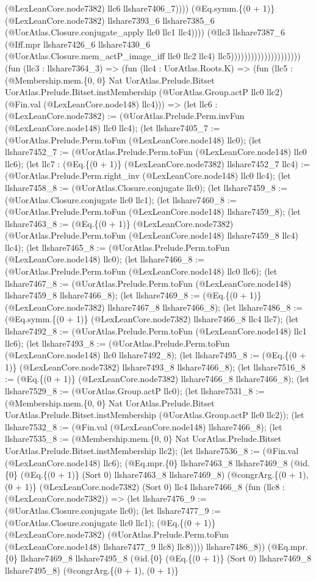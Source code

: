 \documentclass[11pt]{article}
\begin{document}
(@LexLeanCore.node7382) llc6 llshare7406\_7)))) (@Eq.symm.\{(0 + 1)\} (@LexLeanCore.node7382) llshare7393\_6 llshare7385\_6 (@UorAtlas.Closure.conjugate\_apply llc0 llc1 llc4)))) (@llc3 llshare7387\_6 (@Iff.mpr llshare7426\_6 llshare7430\_6 (@UorAtlas.Closure.mem\_actP\_image\_iff llc0 llc2 llc4) llc5))))))))))))))))))))) (fun (llc3 : llshare7364\_3) => (fun (llc4 : UorAtlas.Roots.K) => (fun (llc5 : (@Membership.mem.\{0, 0\} Nat UorAtlas.Prelude.Bitset UorAtlas.Prelude.Bitset.instMembership (@UorAtlas.Group.actP llc0 llc2) (@Fin.val (@LexLeanCore.node148) llc4))) => (let llc6 : (@LexLeanCore.node7382) := (@UorAtlas.Prelude.Perm.invFun (@LexLeanCore.node148) llc0 llc4); (let llshare7405\_7 := (@UorAtlas.Prelude.Perm.toFun (@LexLeanCore.node148) llc0); (let llshare7452\_7 := (@UorAtlas.Prelude.Perm.toFun (@LexLeanCore.node148) llc0 llc6); (let llc7 : (@Eq.\{(0 + 1)\} (@LexLeanCore.node7382) llshare7452\_7 llc4) := (@UorAtlas.Prelude.Perm.right\_inv (@LexLeanCore.node148) llc0 llc4); (let llshare7458\_8 := (@UorAtlas.Closure.conjugate llc0); (let llshare7459\_8 := (@UorAtlas.Closure.conjugate llc0 llc1); (let llshare7460\_8 := (@UorAtlas.Prelude.Perm.toFun (@LexLeanCore.node148) llshare7459\_8); (let llshare7463\_8 := (@Eq.\{(0 + 1)\} (@LexLeanCore.node7382) (@UorAtlas.Prelude.Perm.toFun (@LexLeanCore.node148) llshare7459\_8 llc4) llc4); (let llshare7465\_8 := (@UorAtlas.Prelude.Perm.toFun (@LexLeanCore.node148) llc0); (let llshare7466\_8 := (@UorAtlas.Prelude.Perm.toFun (@LexLeanCore.node148) llc0 llc6); (let llshare7467\_8 := (@UorAtlas.Prelude.Perm.toFun (@LexLeanCore.node148) llshare7459\_8 llshare7466\_8); (let llshare7469\_8 := (@Eq.\{(0 + 1)\} (@LexLeanCore.node7382) llshare7467\_8 llshare7466\_8); (let llshare7486\_8 := (@Eq.symm.\{(0 + 1)\} (@LexLeanCore.node7382) llshare7466\_8 llc4 llc7); (let llshare7492\_8 := (@UorAtlas.Prelude.Perm.toFun (@LexLeanCore.node148) llc1 llc6); (let llshare7493\_8 := (@UorAtlas.Prelude.Perm.toFun (@LexLeanCore.node148) llc0 llshare7492\_8); (let llshare7495\_8 := (@Eq.\{(0 + 1)\} (@LexLeanCore.node7382) llshare7493\_8 llshare7466\_8); (let llshare7516\_8 := (@Eq.\{(0 + 1)\} (@LexLeanCore.node7382) llshare7466\_8 llshare7466\_8); (let llshare7529\_8 := (@UorAtlas.Group.actP llc0); (let llshare7531\_8 := (@Membership.mem.\{0, 0\} Nat UorAtlas.Prelude.Bitset UorAtlas.Prelude.Bitset.instMembership (@UorAtlas.Group.actP llc0 llc2)); (let llshare7532\_8 := (@Fin.val (@LexLeanCore.node148) llshare7466\_8); (let llshare7535\_8 := (@Membership.mem.\{0, 0\} Nat UorAtlas.Prelude.Bitset UorAtlas.Prelude.Bitset.instMembership llc2); (let llshare7536\_8 := (@Fin.val (@LexLeanCore.node148) llc6); (@Eq.mpr.\{0\} llshare7463\_8 llshare7469\_8 (@id.\{0\} (@Eq.\{(0 + 1)\} (Sort 0) llshare7463\_8 llshare7469\_8) (@congrArg.\{(0 + 1), (0 + 1)\} (@LexLeanCore.node7382) (Sort 0) llc4 llshare7466\_8 (fun (llc8 : (@LexLeanCore.node7382)) => (let llshare7476\_9 := (@UorAtlas.Closure.conjugate llc0); (let llshare7477\_9 := (@UorAtlas.Closure.conjugate llc0 llc1); (@Eq.\{(0 + 1)\} (@LexLeanCore.node7382) (@UorAtlas.Prelude.Perm.toFun (@LexLeanCore.node148) llshare7477\_9 llc8) llc8)))) llshare7486\_8)) (@Eq.mpr.\{0\} llshare7469\_8 llshare7495\_8 (@id.\{0\} (@Eq.\{(0 + 1)\} (Sort 0) llshare7469\_8 llshare7495\_8) (@congrArg.\{(0 + 1), (0 + 1)\} 
\end{document}
